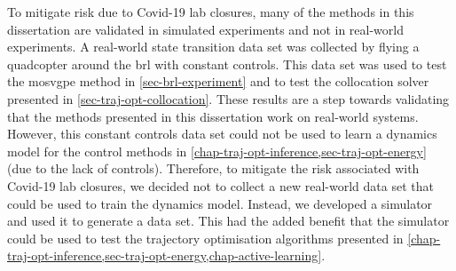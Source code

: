 \documentclass{mimosis-class/mimosis}
\numberwithin{equation}{chapter}
\begin{document}
\label{sec:org91514c9}
\begin{singlespace}
To mitigate risk due to Covid-19 lab closures, many of the methods in this dissertation are validated in
simulated experiments and not in real-world experiments.
A real-world state transition data set was collected by flying a quadcopter around the \acrfull{brl} with constant controls.
This data set was used to test the \acrshort{mosvgpe} method in \cref{sec-brl-experiment}
and to test the collocation solver presented in \cref{sec-traj-opt-collocation}.
These results are a step towards validating that the methods presented in this dissertation work on real-world systems.
However, this constant controls data set could not be used to learn a dynamics model for the control methods
in \cref{chap-traj-opt-inference,sec-traj-opt-energy} (due to the lack of controls).
Therefore, to mitigate the risk associated with Covid-19 lab closures, we decided not to collect a new real-world data set
that could be used to train the dynamics model.
Instead, we developed a simulator and used it to generate a data set.
This had the added benefit that the simulator could be used to test the trajectory optimisation
algorithms presented in \cref{chap-traj-opt-inference,sec-traj-opt-energy,chap-active-learning}.





\end{singlespace}
\end{document}
